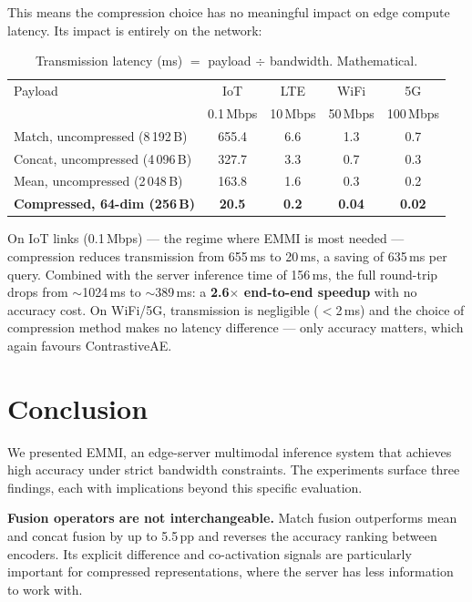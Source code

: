 \documentclass[10pt,twocolumn]{article}
\begin{document}
This means the compression choice has no meaningful impact on edge
compute latency. Its impact is entirely on the network:

\begin{table}[h]
\centering
\caption{Transmission latency (ms) $=$ payload $\div$ bandwidth. Mathematical.}
\label{tab:latency_tx}
\begin{tabular}{lcccc}
\toprule
Payload & IoT & LTE & WiFi & 5G \\
        & 0.1\,Mbps & 10\,Mbps & 50\,Mbps & 100\,Mbps \\
\midrule
Match, uncompressed (8\,192\,B)  & 655.4 & 6.6 & 1.3 & 0.7 \\
Concat, uncompressed (4\,096\,B) & 327.7 & 3.3 & 0.7 & 0.3 \\
Mean, uncompressed (2\,048\,B)   & 163.8 & 1.6 & 0.3 & 0.2 \\
\textbf{Compressed, 64-dim (256\,B)} & \textbf{20.5} & \textbf{0.2} & \textbf{0.04} & \textbf{0.02} \\
\bottomrule
\end{tabular}
\end{table}

On IoT links (0.1\,Mbps) --- the regime where EMMI is most needed ---
compression reduces transmission from 655\,ms to 20\,ms, a saving of
635\,ms per query. Combined with the server inference time of 156\,ms,
the full round-trip drops from $\sim$1024\,ms to $\sim$389\,ms: a
\textbf{2.6$\times$ end-to-end speedup} with no accuracy cost.
On WiFi/5G, transmission is negligible ($<$2\,ms) and the choice of
compression method makes no latency difference --- only accuracy matters,
which again favours ContrastiveAE.


\section{Conclusion}
\label{sec:conclusion}

We presented EMMI, an edge-server multimodal inference system that achieves
high accuracy under strict bandwidth constraints. The experiments surface
three findings, each with implications beyond this specific evaluation.

\textbf{Fusion operators are not interchangeable.} Match fusion
outperforms mean and concat fusion by up to 5.5\,pp and reverses the
accuracy ranking between encoders. Its explicit difference and
co-activation signals are particularly important for compressed
representations, where the server has less information to work with.
\end{document}
